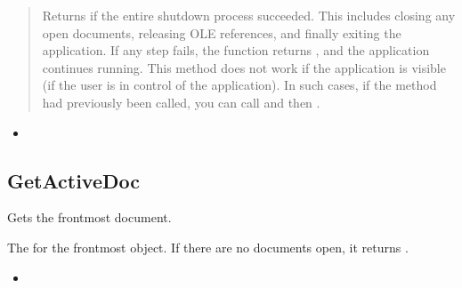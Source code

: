 \documentclass[letterpaper,12pt,english,openany,oneside]{sphinxmanual}
\begin{document}
\begin{quote}

Returns  if the entire shutdown process succeeded. This includes closing any open documents, releasing OLE references, and finally exiting the application. If any step fails, the function returns , and the application continues running. This method does not work if the application is visible (if the user is in control of the application). In such cases, if the  method had previously been called, you can call  and then .
\end{quote}
\label{\detokenize{IAC_API_OLE_Objects:related-methods-1}}
\begin{itemize}
\item {} 
 

\end{itemize}




\subsection{GetActiveDoc}
\label{\detokenize{IAC_API_OLE_Objects:getactivedoc}}
Gets the frontmost document.


\begin{sphinxVerbatim}[commandchars=\\\{\}]
 
\end{sphinxVerbatim}


The  for the frontmost  object. If there are no documents open, it returns .

\label{\detokenize{IAC_API_OLE_Objects:related-methods-2}}
\begin{itemize}
\item {} 
 

\end{itemize}
\end{document}

